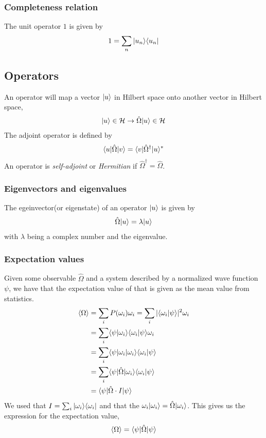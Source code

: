 \subsubsection{Completeness relation}
The unit operator $\mathrm{1}$ is given by
\begin{align}
	\mathrm{1} = \sum_n |{u_n}\rangle \langle{u_n}|
	\label{eq:unit-operator}
\end{align}

\subsection{Operators}
An operator will map a vector $|{u}\rangle$ in Hilbert space onto another vector in Hilbert space,
\begin{align}
	|{u}\rangle \in \mathcal{H} \rightarrow \hat{\Omega}|{u}\rangle \in \mathcal{H}
	\label{eq:operator-mapping}
\end{align}
The adjoint operator is defined by
\begin{align}
	\langle{u}|\hat{\Omega}|{v}\rangle = \langle{v}|\hat{\Omega}^\dagger|{u}\rangle^*
	\label{eq:adjoint-operator}
\end{align}
An operator is \textit{self-adjoint} or \textit{Hermitian} if $\hat{\Omega}^\dagger = \hat{\Omega}$.

\subsubsection{Eigenvectors and eigenvalues}
The egeinvector(or eigenstate) of an operator $|{u}\rangle$ is given by
\begin{align}
	\hat{\Omega}|{u}\rangle = \lambda |{u}\rangle
	\label{eq:}
\end{align}
with $\lambda$ being a complex number and the eigenvalue.

\subsubsection{Expectation values}
Given some observable $\hat{\Omega}$ and a system described by a normalized wave function $\psi$, we have that the expectation value of that is given as the mean value from statistics.
\begin{align*}
	\langle \Omega \rangle &= \sum_i P(\omega_i) \omega_i = \sum_i |\langle{\omega_i}|\psi\rangle|^2\omega_i \\
	&= \sum_i \langle{\psi}|\omega_i\rangle \langle\omega_i |{\psi}\rangle \omega_i \\
	&= \sum_i \langle{\psi}| \omega_i |{\omega_i}\rangle \langle\omega_i |{\psi}\rangle \\
	&= \sum_i \langle{\psi}| \hat{\Omega} |{\omega_i}\rangle \langle\omega_i |{\psi}\rangle \\
	&= \langle{\psi}| \hat{\Omega} \cdot I |{\psi}\rangle \\
\end{align*}
We used that $I = \sum_i |{\omega_i}\rangle\langle{\omega_i}|$ and that the $\omega_i|{{\omega_i}}\rangle = \hat{\Omega}|{\omega_i}\rangle$. This gives us the expression for the expectation value,
\begin{align}
	\left\langle{\Omega}\right\rangle = \langle{\psi}| \hat{\Omega} |{\psi}\rangle
	\label{eq:expectation-value}
\end{align}

